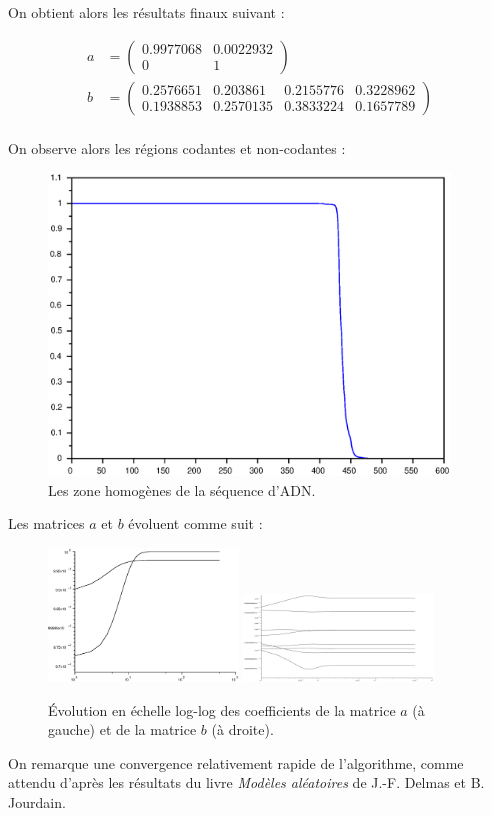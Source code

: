 \documentclass[12pt,a4paper]{article}
\begin{document}
On obtient alors les résultats finaux suivant :

\begin{align*}
a &= \begin{pmatrix}
0.9977068 & 0.0022932 \\
0 		  & 1
\end{pmatrix} \\
b &= \begin{pmatrix}
0.2576651 & 0.203861  & 0.2155776 & 0.3228962 \\  
0.1938853 & 0.2570135 & 0.3833224 & 0.1657789
\end{pmatrix}\\
\end{align*}

On observe alors les régions codantes et non-codantes :

\begin{figure}[H]
	\centering
	\includegraphics[width=0.95\textwidth]{images/figure3.eps}
	\caption{Les zone homogènes de la séquence d'\textsc{ADN}.}
\end{figure}

Les matrices $a$ et $b$ évoluent comme suit :

\begin{figure}[H]
	\centering
	\includegraphics[width=0.45\textwidth]{images/figure4.eps}
	\includegraphics[width=0.45\textwidth]{images/figure5.eps}
	\caption{Évolution en échelle log-log des coefficients de la matrice $a$ (à gauche) et de la matrice $b$ (à droite).}
\end{figure}

On remarque une convergence relativement rapide de l'algorithme, comme attendu d'après les résultats du livre \emph{Modèles aléatoires} de J.-F. Delmas et B. Jourdain.
\end{document}
